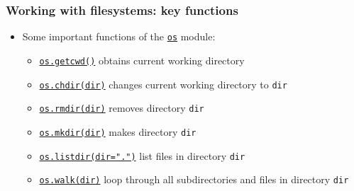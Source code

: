 \documentclass[xcolor=table]{beamer}
\begin{document}
\begin{frame}[fragile]
    \frametitle{Working with filesystems: key functions}
\begin{itemize}\addtolength{\itemsep}{\baselineskip}
        \item Some important functions of the \href{https://docs.python.org/3.7/library/os.html#module-os}{\texttt{os}} module:\pause
            \begin{itemize}\addtolength{\itemsep}{\baselineskip}
                \item \href{https://docs.python.org/3.7/library/os.html#os.getcwd}{\texttt{os.getcwd()}} obtains current working directory \pause
                \item \href{https://docs.python.org/3.7/library/os.html#os.chdir}{\texttt{os.chdir(dir)}} changes current working directory to \texttt{dir} \pause
                \item \href{https://docs.python.org/3.7/library/os.html#os.rmdir}{\texttt{os.rmdir(dir)}} removes directory \texttt{dir} \pause
                \item \href{https://docs.python.org/3.7/library/os.html#os.mkdir}{\texttt{os.mkdir(dir)}} makes directory \texttt{dir} \pause
                \item \href{https://docs.python.org/3.7/library/os.html#os.listdir}{\texttt{os.listdir(dir=".")}} list files in directory \texttt{dir} \pause
                \item \href{https://docs.python.org/3.7/library/os.html#os.walk}{\texttt{os.walk(dir)}} loop through all subdirectories and files in directory \texttt{dir} \pause
        \end{itemize}
    \end{itemize}
\end{frame}
\end{document}
